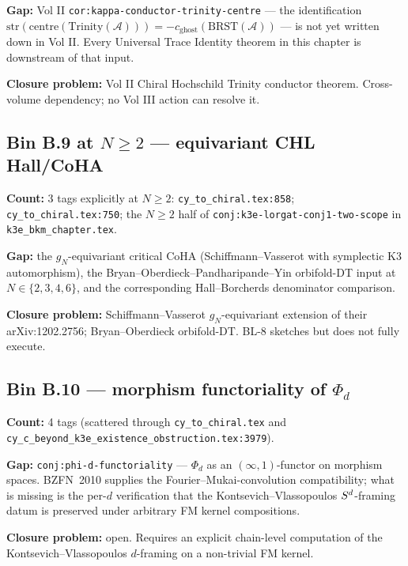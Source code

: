 \documentclass[11pt]{amsart}
\providecommand{\cA}{\mathcal{A}}
\begin{document}
{{\textbf{Gap:} Vol II
\texttt{cor:kappa-conductor-trinity-centre} --- the identification
$\mathrm{str}(\mathrm{centre}(\mathrm{Trinity}(\cA))) = -c_{\mathrm{ghost}}(\mathrm{BRST}(\cA))$
--- is not yet written down in Vol II. Every Universal Trace Identity
theorem in this chapter is downstream of that input.

\textbf{Closure problem:} Vol II Chiral Hochschild Trinity conductor
theorem. Cross-volume dependency; no Vol III action can resolve it.

\subsection{Bin B.9 at $N \geq 2$ --- equivariant CHL Hall/CoHA}
\label{subsec:still-b9-N-ge-2}

\textbf{Count:} 3 tags explicitly at $N \geq 2$: \texttt{cy\_to\_chiral.tex:858}; \texttt{cy\_to\_chiral.tex:750}; the $N \geq 2$ half of \texttt{conj:k3e-lorgat-conj1-two-scope} in \texttt{k3e\_bkm\_chapter.tex}.

\textbf{Gap:} the $g_N$-equivariant critical CoHA (Schiffmann--Vasserot
with symplectic K3 automorphism), the Bryan--Oberdieck--Pandharipande--Yin
orbifold-DT input at $N \in \{2, 3, 4, 6\}$, and the corresponding
Hall--Borcherds denominator comparison.

\textbf{Closure problem:} Schiffmann--Vasserot $g_N$-equivariant
extension of their arXiv:1202.2756; Bryan--Oberdieck orbifold-DT.
BL-8 sketches but does not fully execute.

\subsection{Bin B.10 --- morphism functoriality of $\Phi_d$}
\label{subsec:still-b10}

\textbf{Count:} 4 tags (scattered through \texttt{cy\_to\_chiral.tex} and
\texttt{cy\_c\_beyond\_k3e\_existence\_obstruction.tex:3979}).

\textbf{Gap:} \texttt{conj:phi-d-functoriality} --- $\Phi_d$ as an
$(\infty,1)$-functor on morphism spaces. BZFN~2010 supplies the
Fourier--Mukai-convolution compatibility; what is missing is the
per-$d$ verification that the Kontsevich--Vlassopoulos $S^d$-framing
datum is preserved under arbitrary FM kernel compositions.

\textbf{Closure problem:} open. Requires an explicit chain-level
computation of the Kontsevich--Vlassopoulos $d$-framing on a
non-trivial FM kernel.

}}
\end{document}
